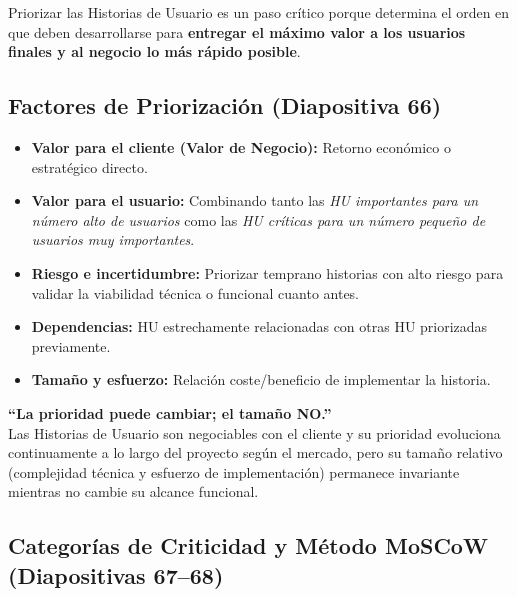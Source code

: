 Priorizar las Historias de Usuario es un paso crítico porque determina el orden en que deben desarrollarse para \textbf{entregar el máximo valor a los usuarios finales y al negocio lo más rápido posible}.

\subsection{Factores de Priorización (Diapositiva 66)}
\begin{itemize}[itemsep=3pt]
    \item \textbf{Valor para el cliente (Valor de Negocio):} Retorno económico o estratégico directo.
    \item \textbf{Valor para el usuario:} Combinando tanto las \textit{HU importantes para un número alto de usuarios} como las \textit{HU críticas para un número pequeño de usuarios muy importantes}.
    \item \textbf{Riesgo e incertidumbre:} Priorizar temprano historias con alto riesgo para validar la viabilidad técnica o funcional cuanto antes.
    \item \textbf{Dependencias:} HU estrechamente relacionadas con otras HU priorizadas previamente.
    \item \textbf{Tamaño y esfuerzo:} Relación coste/beneficio de implementar la historia.
\end{itemize}

\begin{aviso}
\textbf{``La prioridad puede cambiar; el tamaño NO.''}\\
Las Historias de Usuario son negociables con el cliente y su prioridad evoluciona continuamente a lo largo del proyecto según el mercado, pero su tamaño relativo (complejidad técnica y esfuerzo de implementación) permanece invariante mientras no cambie su alcance funcional.
\end{aviso}

\subsection{Categorías de Criticidad y Método MoSCoW (Diapositivas 67--68)}

